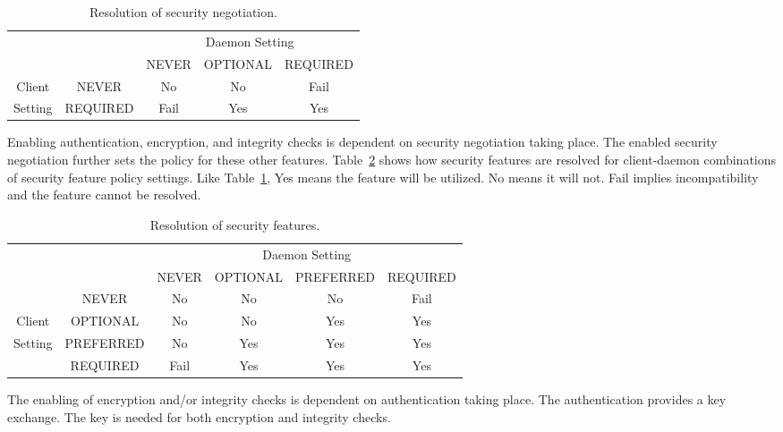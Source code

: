\begin{table}[tb]
\centering
\begin{tabular}{|c|c|c|c|c|}
  \hline
  \multicolumn{2}{|c|}{\hfill} & \multicolumn{3}{c|}{Daemon Setting} \\
  \cline{3-5}
  \multicolumn{2}{|c|}{\hfill} & NEVER & OPTIONAL & REQUIRED \\
  \hline
  \cline{2-5}
  Client & NEVER & No & No & Fail \\
  \cline{2-5}
  Setting & REQUIRED & Fail & Yes & Yes \\
  \hline
\end{tabular}
\caption{\label{table:Sec-Negotiation}Resolution of security negotiation.  }
\end{table}


Enabling authentication, encryption, and integrity checks is
dependent on security negotiation taking place.
The enabled security negotiation further sets the policy for
these other features.
Table~\ref{table:Sec-Resolution} shows how security features
are resolved for client-daemon combinations of security feature policy
settings.
Like Table~\ref{table:Sec-Negotiation},
Yes means the feature will be utilized.
No means it will not.
Fail implies incompatibility and the feature cannot be resolved.


\begin{table}[tb]
\centering
\begin{tabular}{|c|c|c|c|c|c|}
  \hline
  \multicolumn{2}{|c|}{\hfill} & \multicolumn{4}{c|}{Daemon Setting} \\
  \cline{3-6}
  \multicolumn{2}{|c|}{\hfill} & NEVER & OPTIONAL & PREFERRED & REQUIRED \\
  \hline
  \hfill & NEVER & No & No & No & Fail \\
  \cline{2-6}
  Client & OPTIONAL & No & No & Yes & Yes \\
  \cline{2-6}
  Setting & PREFERRED & No & Yes & Yes & Yes \\
  \cline{2-6}
  \hfill & REQUIRED & Fail & Yes & Yes & Yes \\
  \hline
\end{tabular}
\caption{\label{table:Sec-Resolution}Resolution of security features. }
\end{table}


The enabling of encryption and/or integrity checks is dependent on
authentication taking place.
The authentication provides a key exchange.
The key is needed for both encryption and integrity checks.


